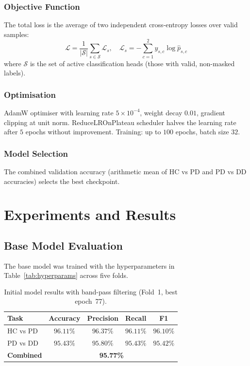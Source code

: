 \documentclass[conference]{IEEEtran}
\begin{document}
\subsubsection{Objective Function}
The total loss is the average of two independent cross-entropy losses over valid samples:
\begin{equation}
\mathcal{L} = \frac{1}{|\mathcal{S}|} \sum_{s \in \mathcal{S}} \mathcal{L}_s, \quad
\mathcal{L}_s = -\sum_{c=1}^{2} y_{s,c} \log \hat{p}_{s,c}
\end{equation}
where $\mathcal{S}$ is the set of active classification heads (those with valid, non-masked labels).

\subsubsection{Optimisation}
AdamW optimiser with learning rate $5 \times 10^{-4}$, weight decay $0.01$, gradient clipping at unit norm. ReduceLROnPlateau scheduler halves the learning rate after $5$ epochs without improvement. Training: up to $100$ epochs, batch size $32$.

\subsubsection{Model Selection}
The combined validation accuracy (arithmetic mean of HC vs PD and PD vs DD accuracies) selects the best checkpoint.

\section{Experiments and Results}

\subsection{Base Model Evaluation}

The base model was trained with the hyperparameters in Table~\ref{tab:hyperparams} across five folds.

\begin{table}[H]
\centering
\caption{Initial model results with band-pass filtering (Fold~1, best epoch~77).}
\label{tab:base_results}
\begin{tabular}{lcccc}
\toprule
\textbf{Task} & \textbf{Accuracy} & \textbf{Precision} & \textbf{Recall} & \textbf{F1} \\
\midrule
HC vs PD & $96.11\%$ & $96.37\%$ & $96.11\%$ & $96.10\%$ \\
PD vs DD & $95.43\%$ & $95.80\%$ & $95.43\%$ & $95.42\%$ \\
\midrule
\textbf{Combined} & \multicolumn{4}{c}{\textbf{95.77\%}} \\
\bottomrule
\end{tabular}
\end{table}
\end{document}
